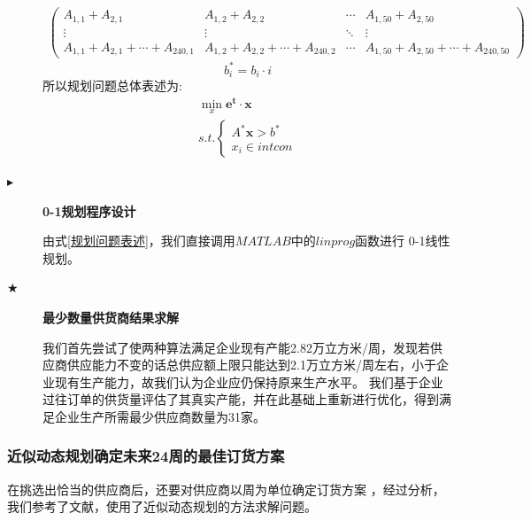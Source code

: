 \documentclass{cumcmthesis}
\begin{document}
\begin{description}
{\begin{equation}
\begin{aligned}
\begin{pmatrix}
                    A_{1,1} + A_{2,1}                      & A_{1,2} + A_{2,2}                      & \cdots & A_{1,50} + A_{2,50}                       \\
                    \vdots                                 & \vdots                                 & \ddots & \vdots                                    \\
                    A_{1,1} + A_{2,1} + \cdots + A_{240,1} & A_{1,2} + A_{2,2} + \cdots + A_{240,2} & \cdots & A_{1,50} + A_{2,50} + \cdots + A_{240,50}
                \end{pmatrix} \nonumber
            \end{aligned}
        \end{equation}
        }
        \begin{equation}
            b^*_i = b_i \cdot i \nonumber
        \end{equation}
        所以规划问题总体表述为:
        \begin{equation}
            \begin{aligned}
                \min_x \bm{e^t}\cdot \bm{x} \\
                s.t. \left\{
                \begin{aligned}
                    A^*\bm{x} > b^* \\
                    x_i \in intcon
                \end{aligned}
                \right.
            \end{aligned} \label{规划问题表述}
        \end{equation}

    \item[$\blacktriangleright$] \textbf{0-1规划程序设计}\par
        由式\ref{规划问题表述}，我们直接调用$MATLAB$中的$linprog$函数进行
        0-1线性规划。
    \item[$\bigstar$] \textbf{最少数量供货商结果求解}\par
        我们首先尝试了使两种算法满足企业现有产能2.82万立方米/周，发现若供应商供应能力不变的话总供应额上限只能达到2.1万立方米/周左右，小于企业现有生产能力，故我们认为企业应仍保持原来生产水平。
        我们基于企业过往订单的供货量评估了其真实产能，并在此基础上重新进行优化，得到满足企业生产所需最少供应商数量为31家。


\end{description}
\subsubsection{近似动态规划确定未来24周的最佳订货方案}
在挑选出恰当的供应商后，还要对供应商以周为单位确定订货方案
，经过分析，我们参考了文献\cite{RN10}，使用了近似动态规划的方法求解问题。
\end{document}
